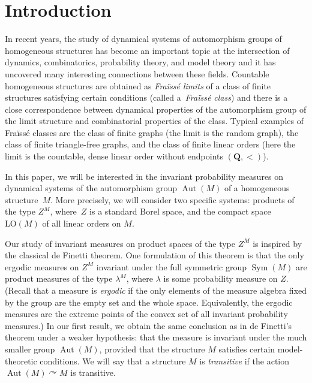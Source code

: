 \documentclass[11pt]{article}
\let\actson\curvearrowright
\theoremstyle{plain}
\theoremstyle{definition}
\newcommand{\Q}{{\mathbf Q}}
\DeclareMathOperator{\Aut}{Aut}
\DeclareMathOperator{\Sym}{Sym}
\newcommand{\LO}{\mathrm{LO}}
\begin{document}
\section{Introduction}
\label{sec:introduction}

In recent years, the study of dynamical systems of automorphism groups of homo\-ge\-neous structures has become an important topic at the intersection of dynamics, combinatorics, probability theory, and model theory and it has uncovered many \hbox{interesting} connections between these fields. Countable homogeneous structures are obtained as \emph{Fraïssé limits} of a class of finite structures satisfying certain conditions (called a~\emph{Fraïssé class}) and there is a close correspondence between dynamical \hbox{properties} of the automorphism group of the limit structure and combinatorial properties of the class. Typical examples of Fraïssé classes are the class of finite graphs (the limit is the random graph), the class of finite triangle-free graphs, and the class of finite linear orders (here the limit is the countable, dense linear order without endpoints $(\Q, <)$).

In this paper, we will be interested in the invariant probability measures on dynamical systems of the automorphism group $\Aut(M)$ of a homogeneous structure~$M$. More precisely, we will consider two specific systems: products of the type $Z^M$, where~$Z$ is a standard Borel space, and the compact space $\LO(M)$ of all linear orders on $M$.\enlargethispage{.5\baselineskip}%

Our study of invariant measures on product spaces of the type $Z^M$ is inspired by the classical de Finetti theorem. One formulation of this theorem is that the only ergodic measures on $Z^M$ invariant under the full symmetric group $\Sym(M)$ are product measures of the type $\lambda^M$, where $\lambda$ is some probability measure on $Z$. (Recall that a measure is \emph{ergodic} if the only elements of the measure algebra fixed by the group are the empty set and the whole space. Equivalently, the ergodic measures are the extreme points of the convex set of all invariant probability measures.) In our first result, we obtain the same conclusion as in de Finetti's theorem under a weaker hypothesis: that the measure is invariant under the much smaller group $\Aut(M)$, provided that the structure $M$ satisfies certain model-theoretic conditions. We will say that a structure $M$ is \emph{transitive} if the action $\Aut(M) \actson M$ is transitive.
\end{document}
